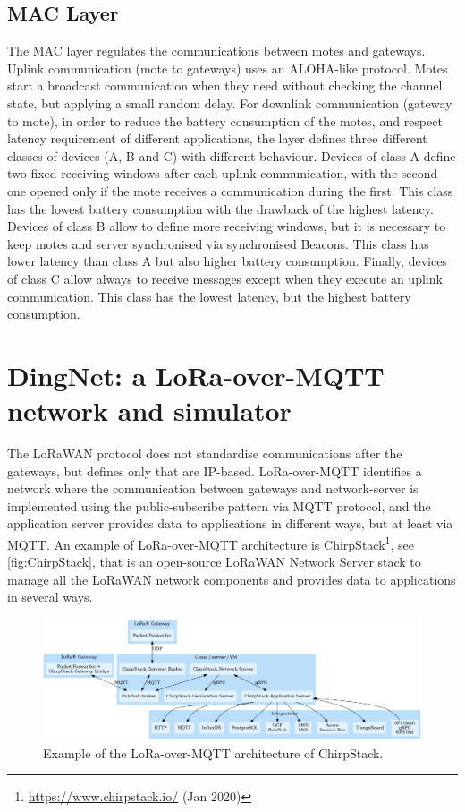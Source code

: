 \subsection{MAC Layer}
The MAC layer regulates the communications between motes and gateways.
% 
Uplink communication (mote to gateways) uses an ALOHA-like protocol. Motes start a broadcast communication when they need without checking the channel state, but applying a small random delay.
% 
For downlink communication (gateway to mote), in order to reduce the battery consumption of the motes, and respect latency requirement of different applications, the layer defines three different classes of devices (A, B and C) with different behaviour.
% 
Devices of class A define two fixed receiving windows after each uplink communication, with the second one opened only if the mote receives a communication during the first. 
% 
This class has the lowest battery consumption with the drawback of the highest latency. 
% 
Devices of class B allow to define more receiving windows, but it is necessary to keep motes and server synchronised via synchronised Beacons. 
% 
This class has lower latency than class A but also higher battery consumption. 
% 
Finally, devices of class C allow always to receive messages except when they execute an uplink communication. 
% 
This class has the lowest latency, but the highest battery consumption.

\section{DingNet: a LoRa-over-MQTT network and simulator}
\label{sec:DingNet}
The LoRaWAN protocol does not standardise communications after the gateways, but defines only that are IP-based.
% 
LoRa-over-MQTT identifies a network where the communication between gateways and network-server is implemented using the public-subscribe pattern via MQTT protocol, and the application server provides data to applications in different ways, but at least via MQTT.
% 
An example of LoRa-over-MQTT architecture is ChirpStack\footnote{\href{https://www.chirpstack.io/}{https://www.chirpstack.io/} (Jan 2020)}, see \autoref{fig:ChirpStack}, that is an open-source LoRaWAN Network Server stack to manage all the LoRaWAN network components and provides data to applications in several ways.

\begin{figure}[h]
    \centering
    \includegraphics[width=\textwidth]{figures/chirpstack.png}
    \caption[LoRa-over-MQTT architecture]{Example of the LoRa-over-MQTT architecture of ChirpStack.~\cite{chirpstack2020}}
    \label{fig:ChirpStack}
\end{figure}

